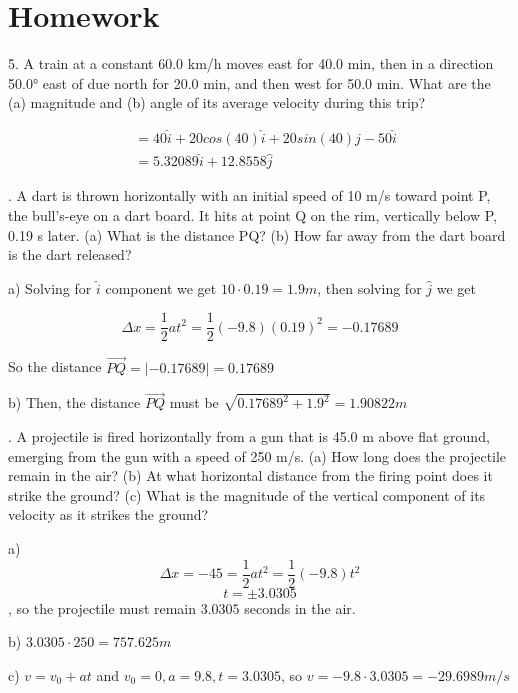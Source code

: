 \documentclass{scrreprt} %
\begin{document}
\section{Homework}

5. A train at a constant 60.0 km/h moves east for 40.0 min,
then  in  a  direction  50.0° east  of  due  north  for  20.0 min, and  then
west for 50.0 min. What are the (a) magnitude and (b) angle of its
average velocity during this trip?

\begin{align*}
	&= 40\hat{i} + 20cos(40)\hat{i} + 20sin(40)\hat{j} - 50 \hat{i} \\
	&= 5.32089\hat{i} + 12.8558\hat{j}
\end{align*}

. A dart is thrown horizontally with an initial speed of 
10 m/s  toward  point  P, the  bull’s-eye  on  a  dart  board. It  hits  at
point Q on the rim, vertically below P, 0.19 s later. (a) What is the
distance PQ?  (b)  How  far  away  from  the  dart  board  is  the  dart
released? \newline

a) Solving for $\hat{i}$ component we get $10\cdot 0.19 = 1.9 m$, then solving
for $\hat{j}$ we get

$$\Delta x = \frac{1}{2}at^2 = \frac{1}{2}(-9.8)(0.19)^2=-0.17689$$

So the distance $\vec{PQ} = |-0.17689| = 0.17689$

b) Then, the distance $\vec{PQ}$ must be $\sqrt{0.17689^2 + 1.9^2} = 1.90822 m$

. A projectile is fired horizontally from a gun that is 
45.0 m above flat ground, emerging from the gun with a speed of
250 m/s. (a) How long does the projectile remain in the air? (b) At
what  horizontal  distance  from  the  firing  point  does  it  strike  the
ground? (c) What is the magnitude of the vertical component of its
velocity as it strikes the ground? \newline

a) $$\Delta x = -45 = \frac{1}{2}at^2 = \frac{1}{2}(-9.8)t^2$$
$$t = \pm 3.0305$$, so the projectile must remain $3.0305$ seconds in the air.

b) $3.0305\cdot 250 = 757.625 m$

c) $v = v_0 + at$ and $v_0 = 0, a = 9.8, t = 3.0305$, so $v = -9.8\cdot 3.0305 = -29.6989 m/s$
\end{document}
